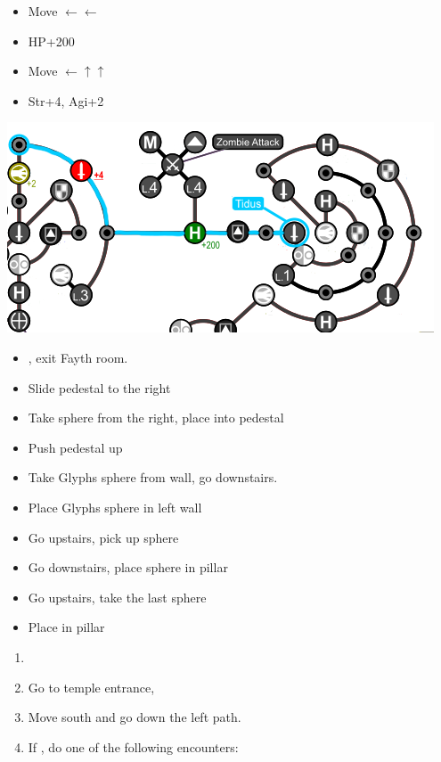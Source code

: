 \begin{spheregrid}
  \begin{itemize}
    \tidusf
    \begin{itemize}
      \item Move $\leftarrow\leftarrow$
      \item HP+200
      \item Move $\leftarrow\uparrow\uparrow$
      \item Str+4, Agi+2
    \end{itemize}
    \includegraphics[width=.8\columnwidth]{graphics/Tidus_Post_Seymour}
  \end{itemize}
\end{spheregrid}
\begin{trial}
  \begin{itemize}
    \item \save, exit Fayth room.
    \item Slide pedestal to the right
    \item Take sphere from the right, place into pedestal
    \item Push pedestal up
    \item Take Glyphs sphere from wall, go downstairs.
    \item Place Glyphs sphere in left wall
    \item Go upstairs, pick up sphere
    \item Go downstairs, place sphere in pillar
    \item Go upstairs, take the last sphere
    \item Place in pillar
  \end{itemize}
\end{trial}
\begin{enumerate}[resume]
  \item \formation{\rikku}{\tidus}{\yuna}
  \item Go to temple entrance, \sd
  \item Move south and go down the left path.
  \item If \blitzloss, do one of the following encounters:
\end{enumerate}
